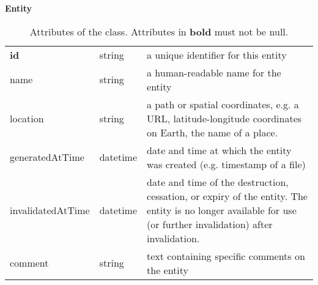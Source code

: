 \begin{table}[ht]
\small
{}\textwidth
\textbf{\normalsize Entity}\vspace{0.25em}\\
\begin{tabulary}{1.0\textwidth}{llL}
\toprule
{} &  & \\
\midrule
\textbf{id} & string & a unique identifier for this entity\\
name        & string & a human-readable name for the entity\\
location    & string & a path or spatial coordinates, e.g. a URL, latitude-longitude coordinates on Earth, the name of a place.\\
generatedAtTime  & datetime & date and time at which the entity was created (e.g. timestamp of a file)\\
invalidatedAtTime  & datetime & date and time of the destruction, cessation, or expiry of the entity. The entity is no longer available for use (or further invalidation) after invalidation.\\
comment  &  string & text containing specific comments on the entity\\
\bottomrule
\end{tabulary}
\caption[Attributes of the  class]{Attributes of the  class. Attributes in \textbf{bold} must not be null.
}\label{tab:entity}
\end{table}



